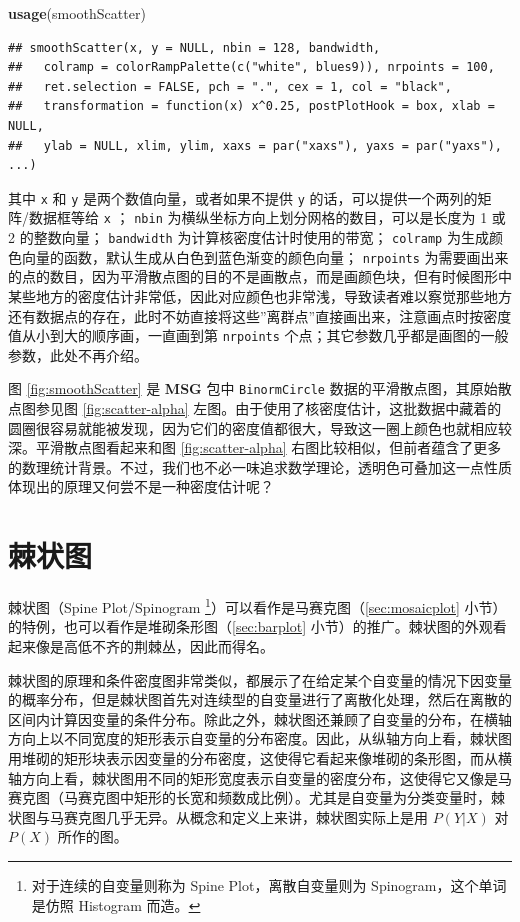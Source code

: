 \documentclass[
  b5paper,
  UTF8,twoside]{book}
\newenvironment{Shaded}{\begin{snugshade}}{\end{snugshade}}
\newcommand{\FunctionTok}[1]{\textcolor[rgb]{0.13,0.29,0.53}{\textbf{#1}}}
\newcommand{\NormalTok}[1]{#1}
\begin{document}
\begin{Shaded}
\begin{Highlighting}[]
\FunctionTok{usage}\NormalTok{(smoothScatter)}
\end{Highlighting}
\end{Shaded}

\begin{verbatim}
## smoothScatter(x, y = NULL, nbin = 128, bandwidth,
##   colramp = colorRampPalette(c("white", blues9)), nrpoints = 100,
##   ret.selection = FALSE, pch = ".", cex = 1, col = "black",
##   transformation = function(x) x^0.25, postPlotHook = box, xlab = NULL,
##   ylab = NULL, xlim, ylim, xaxs = par("xaxs"), yaxs = par("yaxs"), ...)
\end{verbatim}

其中 \texttt{x} 和 \texttt{y} 是两个数值向量，或者如果不提供 \texttt{y} 的话，可以提供一个两列的矩阵/数据框等给 \texttt{x} ； \texttt{nbin} 为横纵坐标方向上划分网格的数目，可以是长度为 1 或 2 的整数向量； \texttt{bandwidth} 为计算核密度估计时使用的带宽； \texttt{colramp} 为生成颜色向量的函数，默认生成从白色到蓝色渐变的颜色向量； \texttt{nrpoints} 为需要画出来的点的数目，因为平滑散点图的目的不是画散点，而是画颜色块，但有时候图形中某些地方的密度估计非常低，因此对应颜色也非常浅，导致读者难以察觉那些地方还有数据点的存在，此时不妨直接将这些''离群点''直接画出来，注意画点时按密度值从小到大的顺序画，一直画到第 \texttt{nrpoints} 个点；其它参数几乎都是画图的一般参数，此处不再介绍。

图 \ref{fig:smoothScatter} 是 \textbf{MSG} 包中 \texttt{BinormCircle} 数据的平滑散点图，其原始散点图参见图 \ref{fig:scatter-alpha} 左图。由于使用了核密度估计，这批数据中藏着的圆圈很容易就能被发现，因为它们的密度值都很大，导致这一圈上颜色也就相应较深。平滑散点图看起来和图 \ref{fig:scatter-alpha} 右图比较相似，但前者蕴含了更多的数理统计背景。不过，我们也不必一味追求数学理论，透明色可叠加这一点性质体现出的原理又何尝不是一种密度估计呢？

\section{棘状图}\label{sec:spineplot}

棘状图（Spine Plot/Spinogram \footnote{对于连续的自变量则称为 Spine Plot，离散自变量则为 Spinogram，这个单词是仿照 Histogram 而造。}）可以看作是马赛克图（\ref{sec:mosaicplot} 小节）的特例，也可以看作是堆砌条形图（\ref{sec:barplot} 小节）的推广。棘状图的外观看起来像是高低不齐的荆棘丛，因此而得名。

棘状图的原理和条件密度图非常类似，都展示了在给定某个自变量的情况下因变量的概率分布，但是棘状图首先对连续型的自变量进行了离散化处理，然后在离散的区间内计算因变量的条件分布。除此之外，棘状图还兼顾了自变量的分布，在横轴方向上以不同宽度的矩形表示自变量的分布密度。因此，从纵轴方向上看，棘状图用堆砌的矩形块表示因变量的分布密度，这使得它看起来像堆砌的条形图，而从横轴方向上看，棘状图用不同的矩形宽度表示自变量的密度分布，这使得它又像是马赛克图（马赛克图中矩形的长宽和频数成比例）。尤其是自变量为分类变量时，棘状图与马赛克图几乎无异。从概念和定义上来讲，棘状图实际上是用 \(P(Y|X)\) 对 \(P(X)\) 所作的图。
\end{document}
